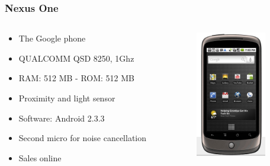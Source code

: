 \documentclass{beamer}
\begin{document}
\begin{frame}
\frametitle{Nexus One}

\begin{columns}
\begin{column}{0.5\textwidth}

\begin{itemize}

\item The Google phone
\item QUALCOMM QSD 8250, 1Ghz
\item RAM: 512 MB - ROM: 512 MB
\item Proximity and light sensor
\item Software: Android 2.3.3
\item Second micro for noise cancellation
\item Sales online
\end{itemize}
\end{column}

\begin{column}{0.5\textwidth}
\begin{center}
  \includegraphics[height=5.5cm]{figs/nexus-one}
\end{center}
\end{column}
\end{columns}
\end{frame}
\end{document}
